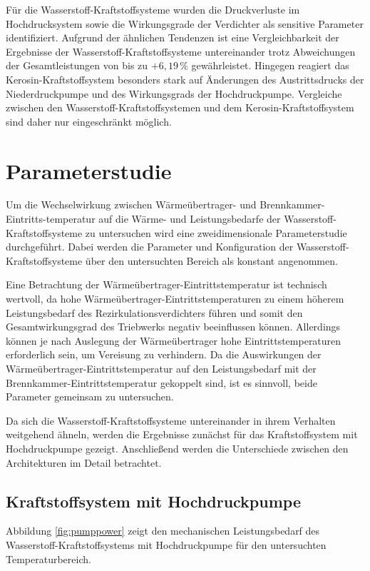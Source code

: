 Für die Wasserstoff-Kraftstoffsysteme wurden die Druckverluste im Hochdrucksystem sowie die Wirkungsgrade der Verdichter als sensitive Parameter identifiziert. Aufgrund der ähnlichen Tendenzen ist eine Vergleichbarkeit der Ergebnisse der Wasserstoff-Kraftstoffsysteme untereinander trotz Abweichungen der Gesamtleistungen von bis zu $+6,19\,\%$ gewährleistet. Hingegen reagiert das Kerosin-Kraftstoffsystem besonders stark auf Änderungen des Austrittsdrucks der Niederdruckpumpe und des Wirkungsgrads der Hochdruckpumpe. Vergleiche zwischen den Wasserstoff-Kraftstoffsystemen und dem Kerosin-Kraftstoffsystem sind daher nur eingeschränkt möglich.

\section{Parameterstudie}

Um die Wechselwirkung zwischen Wärmeübertrager- und Brennkammer-Eintritts-temperatur auf die Wärme- und Leistungsbedarfe der Wasserstoff-Kraftstoffsysteme zu untersuchen wird eine zweidimensionale Parameterstudie durchgeführt. Dabei werden die Parameter und Konfiguration der Wasserstoff-Kraftstoffsysteme über den untersuchten Bereich als konstant angenommen. 

Eine Betrachtung der Wärmeübertrager-Eintrittstemperatur ist technisch wertvoll, da hohe Wärmeübertrager-Eintrittstemperaturen zu einem höherem Leistungsbedarf des Rezirkulationsverdichters führen und somit den Gesamtwirkungsgrad des Triebwerks negativ beeinflussen können. Allerdings können je nach Auslegung der Wärmeübertrager hohe Eintrittstemperaturen erforderlich sein, um Vereisung zu verhindern. Da die Auswirkungen der Wärmeübertrager-Eintrittstemperatur auf den Leistungsbedarf mit der Brennkammer-Eintrittstemperatur gekoppelt sind, ist es sinnvoll, beide Parameter gemeinsam zu untersuchen. 

Da sich die Wasserstoff-Kraftstoffsysteme untereinander in ihrem Verhalten weitgehend ähneln, werden die Ergebnisse zunächst für das Kraftstoffsystem mit Hochdruckpumpe gezeigt. Anschließend werden die Unterschiede zwischen den Architekturen im Detail betrachtet.

\subsection{Kraftstoffsystem mit Hochdruckpumpe}

Abbildung \ref{fig:pumppower} zeigt den mechanischen Leistungsbedarf des Wasserstoff-Kraftstoffsystems mit Hochdruckpumpe für den untersuchten Temperaturbereich. 

